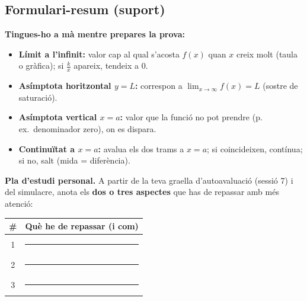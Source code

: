 \subsection{Formulari-resum (suport)}

\begin{idea}
\textbf{Tingues-ho a mà mentre prepares la prova:}
\begin{itemize}[leftmargin=1.4em, itemsep=2pt]
  \item \textbf{Límit a l'infinit:} valor cap al qual s'acosta $f(x)$ quan $x$ creix
        molt (taula o gràfica); si $\frac{k}{x}$ apareix, tendeix a $0$.
  \item \textbf{Asímptota horitzontal $y=L$:} correspon a $\lim_{x\to\infty}f(x)=L$
        (sostre de saturació).
  \item \textbf{Asímptota vertical $x=a$:} valor que la funció no pot prendre (p.\,ex.\
        denominador zero), on es dispara.
  \item \textbf{Continuïtat a $x=a$:} avalua els dos trams a $x=a$; si coincideixen,
        contínua; si no, salt (mida = diferència).
\end{itemize}
\end{idea}

\noindent\textbf{Pla d'estudi personal.} A partir de la teva graella d'autoavaluació
(sessió 7) i del simulacre, anota els \textbf{dos o tres aspectes} que has de repassar
amb més atenció:
\begin{center}
\renewcommand{\arraystretch}{1.5}
\begin{tabular}{c p{10.5cm}}
\toprule
\textbf{\#} & \textbf{Què he de repassar (i com)} \\
\midrule
1 & \rule{9.8cm}{0.4pt} \\
2 & \rule{9.8cm}{0.4pt} \\
3 & \rule{9.8cm}{0.4pt} \\
\bottomrule
\end{tabular}
\end{center}

